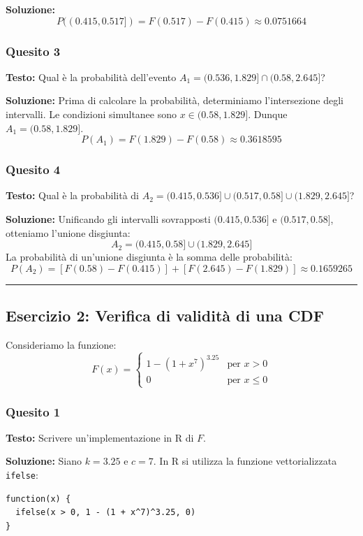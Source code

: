 \documentclass[12pt, a4paper]{article}
\begin{document}
\textbf{Soluzione:}
$$P((0.415, 0.517]) = F(0.517) - F(0.415) \approx 0.0751664$$

\subsubsection*{Quesito 3}
\textbf{Testo:} Qual è la probabilità dell'evento $A_1 = (0.536, 1.829] \cap (0.58, 2.645]$?

\textbf{Soluzione:}
Prima di calcolare la probabilità, determiniamo l'intersezione degli intervalli. Le condizioni simultanee sono $x \in (0.58, 1.829]$. Dunque $A_1 = (0.58, 1.829]$.
$$P(A_1) = F(1.829) - F(0.58) \approx 0.3618595$$

\subsubsection*{Quesito 4}
\textbf{Testo:} Qual è la probabilità di $A_2 = (0.415, 0.536] \cup (0.517, 0.58] \cup (1.829, 2.645]$?

\textbf{Soluzione:}
Unificando gli intervalli sovrapposti $(0.415, 0.536]$ e $(0.517, 0.58]$, otteniamo l'unione disgiunta:
$$A_2 = (0.415, 0.58] \cup (1.829, 2.645]$$
La probabilità di un'unione disgiunta è la somma delle probabilità:
$$P(A_2) = [F(0.58) - F(0.415)] + [F(2.645) - F(1.829)] \approx 0.1659265$$

\vspace{0.5cm}\hrule\vspace{0.5cm}

\subsection*{Esercizio 2: Verifica di validità di una CDF}
Consideriamo la funzione:
$$
F(x) = 
\begin{cases} 
1 - (1+x^7)^{3.25} & \text{per } x > 0 \\
0 & \text{per } x \le 0
\end{cases}
$$

\subsubsection*{Quesito 1}
\textbf{Testo:} Scrivere un'implementazione in R di $F$.

\textbf{Soluzione:}
Siano $k=3.25$ e $c=7$. In R si utilizza la funzione vettorializzata \texttt{ifelse}:
\begin{verbatim}
function(x) {
  ifelse(x > 0, 1 - (1 + x^7)^3.25, 0)
}
\end{verbatim}
\end{document}
